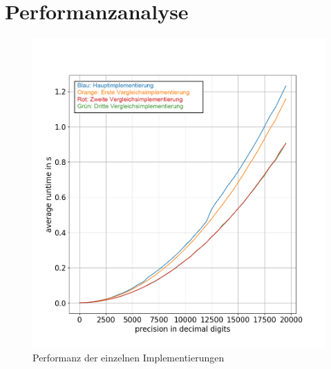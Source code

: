 \documentclass[course=erap]{aspdoc}
\begin{document}
\section{Performanzanalyse} \label{sec:performanz}
\begin{figure}[h] \centering
  \includegraphics[scale=0.5]{graphiken/performanz-diagramm.png}
  \caption{Performanz der einzelnen Implementierungen} \label{img:performanz-diagramm}
\end{figure}  
\end{document}
